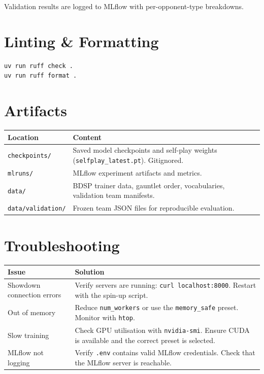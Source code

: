 Validation results are logged to MLflow with per-opponent-type breakdowns.

\section{Linting \& Formatting}

\begin{lstlisting}[language=bash]
uv run ruff check .
uv run ruff format .
\end{lstlisting}

\section{Artifacts}

\begin{center}
\small
\begin{tabularx}{\textwidth}{l X}
  \toprule
  \textbf{Location} & \textbf{Content} \\
  \midrule
  \texttt{checkpoints/}     & Saved model checkpoints and self-play weights
                              (\texttt{selfplay\_latest.pt}).  Gitignored. \\
  \texttt{mlruns/}          & MLflow experiment artifacts and metrics. \\
  \texttt{data/}            & BDSP trainer data, gauntlet order, vocabularies,
                              validation team manifests. \\
  \texttt{data/validation/} & Frozen team JSON files for reproducible
                              evaluation. \\
  \bottomrule
\end{tabularx}
\end{center}

\section{Troubleshooting}

\begin{center}
\small
\begin{tabularx}{\textwidth}{l X}
  \toprule
  \textbf{Issue} & \textbf{Solution} \\
  \midrule
  Showdown connection errors &
    Verify servers are running: \texttt{curl localhost:8000}.  Restart with
    the spin-up script. \\
  Out of memory &
    Reduce \texttt{num\_workers} or use the \texttt{memory\_safe} preset.
    Monitor with \texttt{htop}. \\
  Slow training &
    Check GPU utilisation with \texttt{nvidia-smi}.  Ensure CUDA is
    available and the correct preset is selected. \\
  MLflow not logging &
    Verify \texttt{.env} contains valid MLflow credentials.  Check that
    the MLflow server is reachable. \\
  \bottomrule
\end{tabularx}
\end{center}
